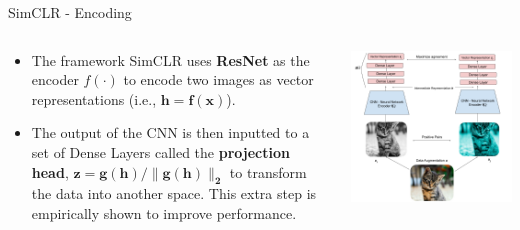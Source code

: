 \documentclass[aspectratio=169,mathserif]{beamer}  %
\newcommand{\tb}{\textbf}
\begin{document}
\begin{frame}{SimCLR - Encoding}

\begin{columns}[T]
\begin{column}{0.4\textwidth}
\begin{itemize}[<+->]
    \item The framework SimCLR uses \tb{ResNet} as the encoder $f(\cdot)$ to encode two images as vector representations (i.e., $\bm{h=f(x)}$). 
    \item The output of the CNN is then inputted to a set of Dense Layers called the \tb{projection head}, $\bm{z=g(h)/\|g(h)\|_2}$ to transform the data into another space. This extra step is empirically shown to improve performance.
\end{itemize}
\end{column}
\begin{column}{0.55\textwidth}
    \includegraphics[width=\linewidth]{figure5.png}
\end{column}
\end{columns}

\end{frame}
\end{document}
